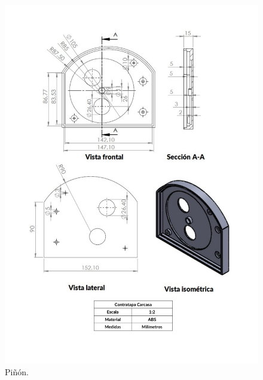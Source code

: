 \documentclass{article}
\begin{document}
\begin{figure}[ht]
\centering
\includegraphics[width=\textwidth]{PlanoContratapaCarcasa.pdf}
\caption{Piñón.}
\end{figure}
\end{document}
